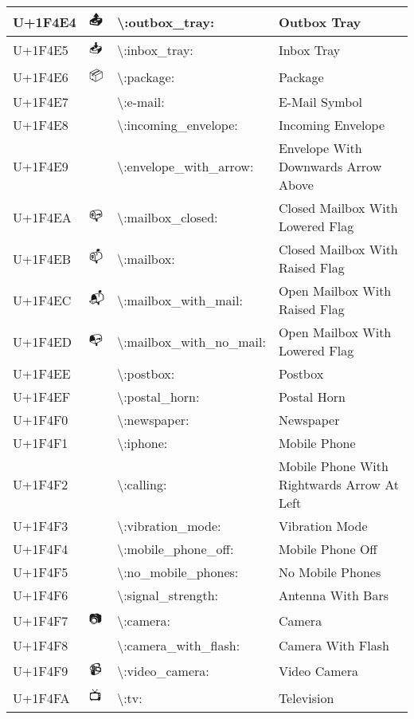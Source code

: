 \begin{table}[h]
\begin{tabulary}{\linewidth}{|L|L|L|L|}
\hline
U+1F4E4 & 📤 & {\textbackslash}:outbox\_tray: & Outbox Tray \\
\hline
U+1F4E5 & 📥 & {\textbackslash}:inbox\_tray: & Inbox Tray \\
\hline
U+1F4E6 & 📦 & {\textbackslash}:package: & Package \\
\hline
U+1F4E7 & 📧 & {\textbackslash}:e-mail: & E-Mail Symbol \\
\hline
U+1F4E8 & 📨 & {\textbackslash}:incoming\_envelope: & Incoming Envelope \\
\hline
U+1F4E9 & 📩 & {\textbackslash}:envelope\_with\_arrow: & Envelope With Downwards Arrow Above \\
\hline
U+1F4EA & 📪 & {\textbackslash}:mailbox\_closed: & Closed Mailbox With Lowered Flag \\
\hline
U+1F4EB & 📫 & {\textbackslash}:mailbox: & Closed Mailbox With Raised Flag \\
\hline
U+1F4EC & 📬 & {\textbackslash}:mailbox\_with\_mail: & Open Mailbox With Raised Flag \\
\hline
U+1F4ED & 📭 & {\textbackslash}:mailbox\_with\_no\_mail: & Open Mailbox With Lowered Flag \\
\hline
U+1F4EE & 📮 & {\textbackslash}:postbox: & Postbox \\
\hline
U+1F4EF & 📯 & {\textbackslash}:postal\_horn: & Postal Horn \\
\hline
U+1F4F0 & 📰 & {\textbackslash}:newspaper: & Newspaper \\
\hline
U+1F4F1 & 📱 & {\textbackslash}:iphone: & Mobile Phone \\
\hline
U+1F4F2 & 📲 & {\textbackslash}:calling: & Mobile Phone With Rightwards Arrow At Left \\
\hline
U+1F4F3 & 📳 & {\textbackslash}:vibration\_mode: & Vibration Mode \\
\hline
U+1F4F4 & 📴 & {\textbackslash}:mobile\_phone\_off: & Mobile Phone Off \\
\hline
U+1F4F5 & 📵 & {\textbackslash}:no\_mobile\_phones: & No Mobile Phones \\
\hline
U+1F4F6 & 📶 & {\textbackslash}:signal\_strength: & Antenna With Bars \\
\hline
U+1F4F7 & 📷 & {\textbackslash}:camera: & Camera \\
\hline
U+1F4F8 & 📸 & {\textbackslash}:camera\_with\_flash: & Camera With Flash \\
\hline
U+1F4F9 & 📹 & {\textbackslash}:video\_camera: & Video Camera \\
\hline
U+1F4FA & 📺 & {\textbackslash}:tv: & Television \\

\end{tabulary}
\end{table}
